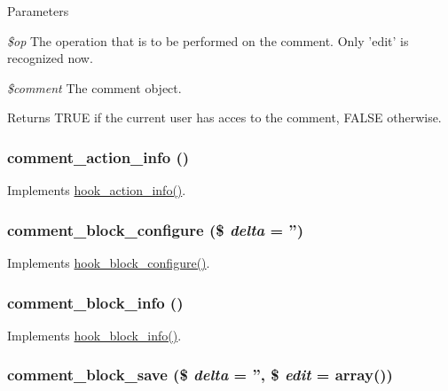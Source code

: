 \begin{DoxyParams}{Parameters}
\item[{\em \$op}]The operation that is to be performed on the comment. Only 'edit' is recognized now. \item[{\em \$comment}]The comment object. \end{DoxyParams}
\begin{DoxyReturn}{Returns}
TRUE if the current user has acces to the comment, FALSE otherwise. 
\end{DoxyReturn}
\hypertarget{comment_8module_ab37670c10a61b72e8a861c547f1770ab}{
\subsubsection[{comment\_\-action\_\-info}]{\setlength{\rightskip}{0pt plus 5cm}comment\_\-action\_\-info ()}}
\label{comment_8module_ab37670c10a61b72e8a861c547f1770ab}
Implements \hyperlink{group__actions_ga3df26c5d6496c91fcd0edd8648023fb4}{hook\_\-action\_\-info()}. \hypertarget{comment_8module_a3da253fa805d0d75f18d87635dbb562a}{
\subsubsection[{comment\_\-block\_\-configure}]{\setlength{\rightskip}{0pt plus 5cm}comment\_\-block\_\-configure (\$ {\em delta} = {\ttfamily ''})}}
\label{comment_8module_a3da253fa805d0d75f18d87635dbb562a}
Implements \hyperlink{group__hooks_gacc86fefd1e0299f387f79a37dd1a48b7}{hook\_\-block\_\-configure()}. \hypertarget{comment_8module_a5ae66e2c95e26f6694418807241fac4c}{
\subsubsection[{comment\_\-block\_\-info}]{\setlength{\rightskip}{0pt plus 5cm}comment\_\-block\_\-info ()}}
\label{comment_8module_a5ae66e2c95e26f6694418807241fac4c}
Implements \hyperlink{group__hooks_ga2bd926c3e90deeba0c3ba64fb3c64d73}{hook\_\-block\_\-info()}. \hypertarget{comment_8module_a565b5b4ebd9bb223e1e51ea00716b904}{
\subsubsection[{comment\_\-block\_\-save}]{\setlength{\rightskip}{0pt plus 5cm}comment\_\-block\_\-save (\$ {\em delta} = {\ttfamily ''}, \/  \$ {\em edit} = {\ttfamily array()})}}
